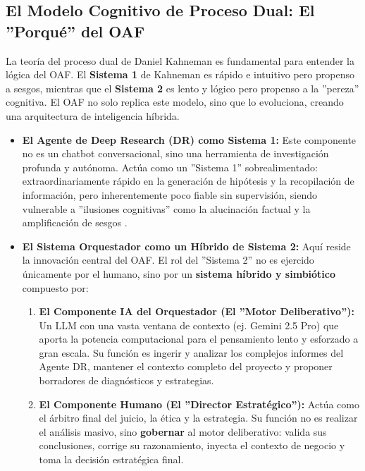 \documentclass[11pt, a4paper]{article}
\begin{document}
\subsection{El Modelo Cognitivo de Proceso Dual: El ''Porqué'' del OAF}
La teoría del proceso dual de Daniel Kahneman \cite{kahneman2011} es fundamental para entender la lógica del OAF. El \textbf{Sistema 1} de Kahneman es rápido e intuitivo pero propenso a sesgos, mientras que el \textbf{Sistema 2} es lento y lógico pero propenso a la ''pereza'' cognitiva. El OAF no solo replica este modelo, sino que lo evoluciona, creando una arquitectura de inteligencia híbrida.

\begin{itemize}
    \item \textbf{El Agente de Deep Research (DR) como Sistema 1:}
    Este componente no es un chatbot conversacional, sino una herramienta de investigación profunda y autónoma. Actúa como un ''Sistema 1'' sobrealimentado: extraordinariamente rápido en la generación de hipótesis y la recopilación de información, pero inherentemente poco fiable sin supervisión, siendo vulnerable a ''ilusiones cognitivas'' como la alucinación factual y la amplificación de sesgos \cite{aws2024}.
    
    \item \textbf{El Sistema Orquestador como un Híbrido de Sistema 2:}
    Aquí reside la innovación central del OAF. El rol del ''Sistema 2'' no es ejercido únicamente por el humano, sino por un \textbf{sistema híbrido y simbiótico} compuesto por:
    \begin{enumerate}
        \item \textbf{El Componente IA del Orquestador (El ''Motor Deliberativo''):} Un LLM con una vasta ventana de contexto (ej. Gemini 2.5 Pro) que aporta la potencia computacional para el pensamiento lento y esforzado a gran escala. Su función es ingerir y analizar los complejos informes del Agente DR, mantener el contexto completo del proyecto y proponer borradores de diagnósticos y estrategias.
        \item \textbf{El Componente Humano (El ''Director Estratégico''):} Actúa como el árbitro final del juicio, la ética y la estrategia. Su función no es realizar el análisis masivo, sino \textbf{gobernar} al motor deliberativo: valida sus conclusiones, corrige su razonamiento, inyecta el contexto de negocio y toma la decisión estratégica final.
    \end{enumerate}
\end{itemize}
\end{document}
